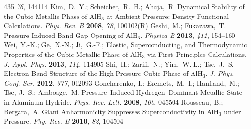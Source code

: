 \documentclass[12pt,letterpaper,oneside]{article}
\begin{document}
\begin{mcitethebibliography}{435}
  \emph{76}, 144114\relax
\mciteBstWouldAddEndPuncttrue
\mciteSetBstMidEndSepPunct{\mcitedefaultmidpunct}
{\mcitedefaultendpunct}{\mcitedefaultseppunct}\relax
\EndOfBibitem
{}
Kim,~D.~Y.; Scheicher,~R.~H.; Ahuja,~R. Dynamical Stability of the Cubic
  Metallic Phase of AlH$_3$ at Ambient Pressure: Density Functional
  Calculations. \emph{Phys. Rev. B} \textbf{2008}, \emph{78}, 100102(R)\relax
\mciteBstWouldAddEndPuncttrue
\mciteSetBstMidEndSepPunct{\mcitedefaultmidpunct}
{\mcitedefaultendpunct}{\mcitedefaultseppunct}\relax
\EndOfBibitem
{}
Geshi,~M.; Fukazawa,~T. Pressure Induced Band Gap Opening of AlH$_3$.
  \emph{Physica B} \textbf{2013}, \emph{411}, 154--160\relax
\mciteBstWouldAddEndPuncttrue
\mciteSetBstMidEndSepPunct{\mcitedefaultmidpunct}
{\mcitedefaultendpunct}{\mcitedefaultseppunct}\relax
\EndOfBibitem
{}
Wei,~Y.-K.; Ge,~N.-N.; Ji,~G.-F.; 
  Elastic, Superconducting, and Thermodynamic Properties of the Cubic Metallic
  Phase of AlH$_3$ via First--Principles Calculations. \emph{J. Appl. Phys.}
  \textbf{2013}, \emph{114}, 114905\relax
\mciteBstWouldAddEndPuncttrue
\mciteSetBstMidEndSepPunct{\mcitedefaultmidpunct}
{\mcitedefaultendpunct}{\mcitedefaultseppunct}\relax
\EndOfBibitem
{}
Shi,~H.; Zarifi,~N.; Yim,~W.-L.; Tse,~J.~S. Electron Band Structure of the High
  Pressure Cubic Phase of AlH$_3$. \emph{J. Phys. Conf. Ser.} \textbf{2012},
  \emph{377}, 012093\relax
\mciteBstWouldAddEndPuncttrue
\mciteSetBstMidEndSepPunct{\mcitedefaultmidpunct}
{\mcitedefaultendpunct}{\mcitedefaultseppunct}\relax
\EndOfBibitem
{}
Goncharenko,~I.; Eremets,~M.~I.; Hanfland,~M.; Tse,~J.~S.; Amboage,~M.
    Pressure--Induced Hydrogen--Dominant Metallic State in
  Aluminum Hydride. \emph{Phys. Rev. Lett.} \textbf{2008}, \emph{100},
  045504\relax
\mciteBstWouldAddEndPuncttrue
\mciteSetBstMidEndSepPunct{\mcitedefaultmidpunct}
{\mcitedefaultendpunct}{\mcitedefaultseppunct}\relax
\EndOfBibitem
{}
Rousseau,~B.; Bergara,~A. Giant Anharmonicity Suppresses Superconductivity in
  AlH$_3$ under Pressure. \emph{Phy. Rev. B} \textbf{2010}, \emph{82},
  104504\relax
\mciteBstWouldAddEndPuncttrue

\end{mcitethebibliography}
\end{document}
